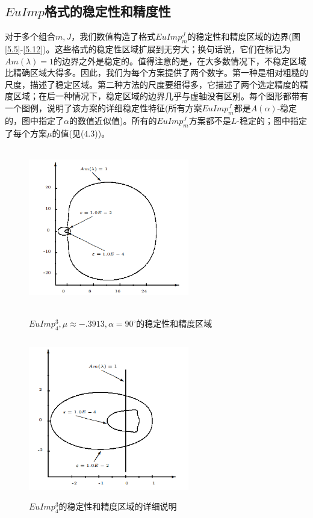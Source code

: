 \documentclass[12pt,a4paper]{article}
\begin{document}
\subsection{$EuImp$格式的稳定性和精度性}

对于多个组合$m,J$，我们数值构造了格式$EuImp^{J}_{m}$的稳定性和精度区域的边界(图\ref{5.5}-\ref{5.12})。这些格式的稳定性区域扩展到无穷大；换句话说，它们在标记为$Am(\lambda)=1$的边界之外是稳定的。值得注意的是，在大多数情况下，不稳定区域比精确区域大得多。因此，我们为每个方案提供了两个数字。第一种是相对粗糙的尺度，描述了稳定区域。第二种方法的尺度要细得多，它描述了两个选定精度的精度区域；在后一种情况下，稳定区域的边界几乎与虚轴没有区别。每个图形都带有一个图例，说明了该方案的详细稳定性特征(所有方案$EuImp^{J}_{m}$都是$A(\alpha)$-稳定的，图中指定了$\alpha$的数值近似值)。所有的$EuImp^{J}_{m}$方案都不是$L$-稳定的；图中指定了每个方案$\mu$的值(见($4.3$))。\\
\begin{figure}[htbp]
	{
		\begin{minipage}{6cm}
			\centering
			\includegraphics[width=7cm,height=7cm]{./figures/5.png}
			\caption{$EuImp_{4}^{3},\mu \approx -.3913,\alpha = 90^{\circ}$的稳定性和精度区域}
			\label{5.5}
		\end{minipage}
	}
	{
		\begin{minipage}{6cm}
			\centering
			\includegraphics[width=7cm,height=7cm]{./figures/6.png}
			\caption{$EuImp_{4}^{3}$的稳定性和精度区域的详细说明}
			\label{5.6}
		\end{minipage}
	}
\end{figure}
\end{document}
